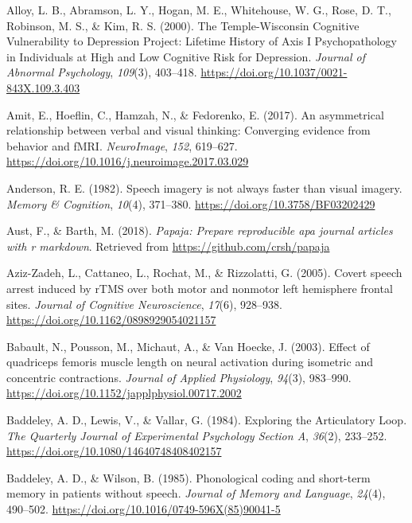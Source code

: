 \documentclass[a4paper,12pt,twoside,openright,oldfontcommands]{memoir}
\begin{document}
\leavevmode\hypertarget{ref-alloy_temple-wisconsin_2000}{}%
Alloy, L. B., Abramson, L. Y., Hogan, M. E., Whitehouse, W. G., Rose, D. T., Robinson, M. S., \& Kim, R. S. (2000). The Temple-Wisconsin Cognitive Vulnerability to Depression Project: Lifetime History of Axis I Psychopathology in Individuals at High and Low Cognitive Risk for Depression. \emph{Journal of Abnormal Psychology}, \emph{109}(3), 403--418. \url{https://doi.org/10.1037/0021-843X.109.3.403}

\leavevmode\hypertarget{ref-amit_asymmetrical_2017}{}%
Amit, E., Hoeflin, C., Hamzah, N., \& Fedorenko, E. (2017). An asymmetrical relationship between verbal and visual thinking: Converging evidence from behavior and fMRI. \emph{NeuroImage}, \emph{152}, 619--627. \url{https://doi.org/10.1016/j.neuroimage.2017.03.029}

\leavevmode\hypertarget{ref-anderson_speech_1982}{}%
Anderson, R. E. (1982). Speech imagery is not always faster than visual imagery. \emph{Memory \& Cognition}, \emph{10}(4), 371--380. \url{https://doi.org/10.3758/BF03202429}

\leavevmode\hypertarget{ref-R-papaja}{}%
Aust, F., \& Barth, M. (2018). \emph{Papaja: Prepare reproducible apa journal articles with r markdown}. Retrieved from \url{https://github.com/crsh/papaja}

\leavevmode\hypertarget{ref-Aziz-Zadeh2005}{}%
Aziz-Zadeh, L., Cattaneo, L., Rochat, M., \& Rizzolatti, G. (2005). Covert speech arrest induced by rTMS over both motor and nonmotor left hemisphere frontal sites. \emph{Journal of Cognitive Neuroscience}, \emph{17}(6), 928--938. \url{https://doi.org/10.1162/0898929054021157}

\leavevmode\hypertarget{ref-babault_effect_2003}{}%
Babault, N., Pousson, M., Michaut, A., \& Van Hoecke, J. (2003). Effect of quadriceps femoris muscle length on neural activation during isometric and concentric contractions. \emph{Journal of Applied Physiology}, \emph{94}(3), 983--990. \url{https://doi.org/10.1152/japplphysiol.00717.2002}

\leavevmode\hypertarget{ref-baddeley_exploring_1984}{}%
Baddeley, A. D., Lewis, V., \& Vallar, G. (1984). Exploring the Articulatory Loop. \emph{The Quarterly Journal of Experimental Psychology Section A}, \emph{36}(2), 233--252. \url{https://doi.org/10.1080/14640748408402157}

\leavevmode\hypertarget{ref-baddeley_phonological_1985}{}%
Baddeley, A. D., \& Wilson, B. (1985). Phonological coding and short-term memory in patients without speech. \emph{Journal of Memory and Language}, \emph{24}(4), 490--502. \url{https://doi.org/10.1016/0749-596X(85)90041-5}
\end{document}
